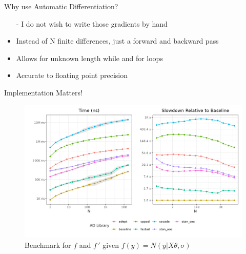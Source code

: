 \documentclass[dvipsnames]{beamer}
\begin{document}
\begin{frame}{Why use Automatic Differentiation?}
\begin{itemize}
\item[-] I do not wish to write those gradients by hand
\pause
{}
\item Instead of N finite differences, just a forward and backward pass
\pause
{}
\item Allows for unknown length while and for loops
\pause
{}
\item Accurate to floating point precision
\pause
\end{itemize}
\end{frame}

\begin{frame}{Implementation Matters!}
\begin{figure}
\centerline{\includegraphics[scale=.5]{img/linux_regression_plot.png}}
\caption{Benchmark for $f$ and $f\,'$ given $f(y) = N(y | X\theta,\sigma)$}
\label{fig-mac-red-bench}
\end{figure}
\end{frame}
\end{document}
